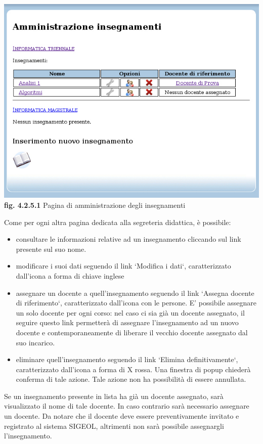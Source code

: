 \documentclass[11pt,a4paper]{article}
\begin{document}
\bigskip
\begin{center}
	\includegraphics[scale=0.5]{images/amministrazione_insegnamenti.jpg}\\
	\textbf{fig. 4.2.5.1} Pagina di amministrazione degli insegnamenti\\
\end{center}
\bigskip

Come per ogni altra pagina dedicata alla segreteria didattica, è possibile:
\begin{itemize}
 \item consultare le informazioni relative ad un insegnamento cliccando sul link presente sul suo nome.
 \item modificare i suoi dati seguendo il link `Modifica i dati`, caratterizzato dall'icona a forma di chiave inglese
 \item assegnare un docente a quell'insegnamento seguendo il link `Assegna docente di riferimento`, caratterizzato dall'icona con le persone. E' possibile assegnare un solo docente per ogni corso: nel caso ci sia già un docente assegnato, il seguire questo link permetterà di assegnare l'insegnamento ad un nuovo docente e contemporaneamente di liberare il vecchio docente assegnato dal suo incarico.
 \item eliminare quell'insegnamento seguendo il link `Elimina definitivamente`, caratterizzato dall'icona a forma di X rossa. Una finestra di popup chiederà conferma di tale azione. Tale azione non ha possibilità di essere annullata.
\end{itemize}

Se un insegnamento presente in lista ha già un docente assegnato, sarà visualizzato il nome di tale docente.
In caso contrario sarà necessario assegnare un docente. Da notare che il docente deve essere preventivamente invitato e registrato al sistema SIGEOL, altrimenti non sarà possibile assegnargli l'insegnamento.
\end{document}
